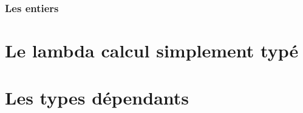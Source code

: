 \documentclass {article}
\theoremstyle{definition}
\theoremstyle{remark}
\begin{document}
\subsubsection{Les entiers}

\section{Le lambda calcul simplement typé}

\section{Les types dépendants}


\end{document}
